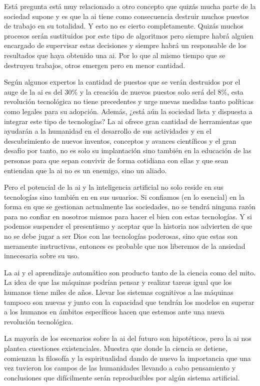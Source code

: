 Está pregunta está muy relacionado a otro concepto que quizás mucha parte de la sociedad supone y es que la \acrshort{ai} tiene como consecuencia destruir muchos puestos de trabajo en su totalidad. Y esto no es cierto completamente. Quizás muchos procesos serán sustituidos por este tipo de algoritmos pero siempre habrá alguien encargado de supervisar estas decisiones y siempre habrá un responsable de los resultados que haya obtenido una \acrshort{ai}. Por lo que al mismo tiempo que se destruyen trabajos, otros emergen pero en menor cantidad.
\newline

Según algunos expertos la cantidad de puestos que se verán destruidos por el auge de la \acrlong{ai} es del 30\% \cite{aijobs} y la creación de nuevos puestos solo será del 8\%, esta revolución tecnológica no tiene precedentes y urge nuevas medidas tanto políticas como legales para su adopción. Además, ¿está aún la sociedad lista y dispuesta a integrar este tipo de tecnologías? La \acrshort{ai} ofrece gran cantidad de herramientas que ayudarán a la humanidad en el desarrollo de sus actividades y en el descubrimiento de nuevos inventos, conceptos y avances científicos y el gran desafío por tanto, no es solo su implantación sino también en la educación de las personas para que sepan convivir de forma cotidiana con ellas y que sean entiendan que la \acrshort{ai} no es un enemigo, sino un aliado.
\newline

Pero el potencial de la \acrshort{ai} y la inteligencia artificial no solo reside en sus tecnologías sino también en en sus usuarios. Si confiamos (en lo esencial) en la forma en que se gestionan actualmente las sociedades, no se tendrá ninguna razón para no confiar en nosotros mismos para hacer el bien con estas tecnologías. Y si podemos suspender el presentismo y aceptar que la historia nos advierten de que no se debe jugar a ser Dios con las tecnologías poderosas, sino que estas son meramente instructivas, entonces es probable que nos liberemos de la ansiedad innecesaria sobre su uso.
\newline

La \acrlong{ai} y el aprendizaje automático son producto tanto de la ciencia como del mito. La idea de que las máquinas podrían pensar y realizar tareas igual que los humanos tiene miles de años. Llevar los sistemas cognitivos a las máquinas tampoco son nuevas y junto con la capacidad que tendrán los modelos en superar a los humanos en ámbitos específicos hacen que estemos ante una nueva revolución tecnológica.
\newline

La mayoría de los escenarios sobre la \acrshort{ai} del futuro son hipotéticos, pero la \acrshort{ai} nos plantea cuestiones existenciales. Muestra que donde la ciencia se detiene, comienzan la filosofía y la espiritualidad dando de nuevo la importancia que una vez tuvieron los campos de las humanidades llevando a cabo pensamiento y conclusiones que difícilmente serán reproducibles por algún sistema artificial.
